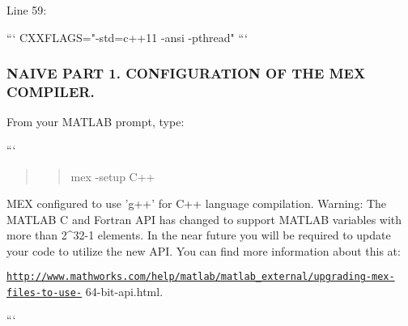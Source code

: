\begin{DoxyPre}Line 59:\end{DoxyPre}



\begin{DoxyPre}```
CXXFLAGS="-std=c++11 -ansi -pthread"
```\end{DoxyPre}



\begin{DoxyPre}\subsubsection*{NAIVE PART 1. CONFIGURATION OF THE MEX COMPILER.}\end{DoxyPre}



\begin{DoxyPre}\end{DoxyPre}



\begin{DoxyPre}From your MATLAB prompt, type:\end{DoxyPre}



\begin{DoxyPre}```
\begin{quotation}
\begin{quotation}
mex -setup C++

\end{quotation}


\end{quotation}
MEX configured to use 'g++' for C++ language compilation.
Warning: The MATLAB C and Fortran API has changed to support MATLAB
     variables with more than 2^32-1 elements. In the near future
     you will be required to update your code to utilize the
     new API. You can find more information about this at:\end{DoxyPre}



\begin{DoxyPre}\href{http://www.mathworks.com/help/matlab/matlab_external/upgrading-mex-files-to-use-}{\tt http://www.mathworks.com/help/matlab/matlab\_external/upgrading-mex-files-to-use-}
64-bit-api.html.
\begin{quotation}
\begin{quotation}


\end{quotation}


\end{quotation}
```\end{DoxyPre}




